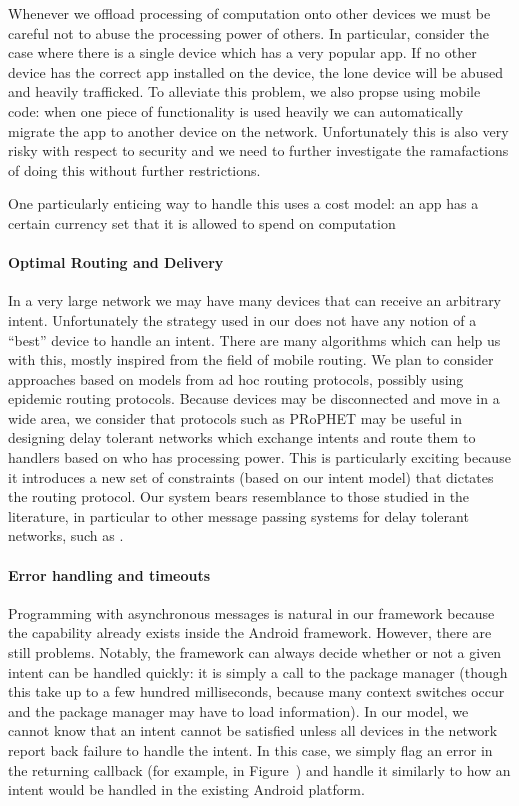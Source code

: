 \documentclass{acm_proc_article-sp}
\begin{document}
Whenever we offload processing of computation onto other devices we
must be careful not to abuse the processing power of others.  In
particular, consider the case where there is a single device which has
a very popular app.  If no other device has the correct app installed
on the device, the lone device will be abused and heavily trafficked.
To alleviate this problem, we also propse using mobile code: when one
piece of functionality is used heavily we can automatically migrate
the app to another device on the network.  Unfortunately this is also
very risky with respect to security and we need to further investigate
the ramafactions of doing this without further restrictions.

One particularly enticing way to handle this uses a cost model: an app
has a certain currency set that it is allowed to spend on computation

\paragraph{Optimal Routing and Delivery}

In a very large network we may have many devices that can receive an
arbitrary intent.  Unfortunately the strategy used in our does not
have any notion of a ``best'' device to handle an intent.  There are
many algorithms which can help us with this, mostly inspired from the
field of mobile routing.  We plan to consider approaches based on
models from ad hoc routing protocols, possibly using epidemic routing
protocols.  Because devices may be disconnected and move in a wide
area, we consider that protocols such as PRoPHET \cite{prophet:2003}
may be useful in designing delay tolerant networks which exchange
intents and route them to handlers based on who has processing power.
This is particularly exciting because it introduces a new set of
constraints (based on our intent model) that dictates the routing
protocol.  Our system bears resemblance to those studied in the
literature, in particular to other message passing systems for delay
tolerant networks, such as \cite{message-passing-dtn}.

\paragraph{Error handling and timeouts} 

Programming with asynchronous messages is natural in our framework
because the capability already exists inside the Android framework.
However, there are still problems.  Notably, the framework can always
decide whether or not a given intent can be handled quickly: it is
simply a call to the package manager (though this take up to a few
hundred milliseconds, because many context switches occur and the
package manager may have to load information).  In our model, we
cannot know that an intent cannot be satisfied unless all devices in
the network report back failure to handle the intent.  In this case,
we simply flag an error in the returning callback (for example, in
Figure~\cite{fig:mobile-intents-email-example}) and handle it similarly
to how an intent would be handled in the existing Android platform.
\end{document}
